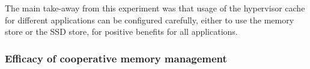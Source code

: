 The main take-away from this experiment was that usage of the hypervisor cache
for different applications can be configured carefully, either to use
the memory store or the SSD store, for positive benefits for all applications.

\subsubsection{Efficacy of cooperative memory management}
\label{subsec:coop}


